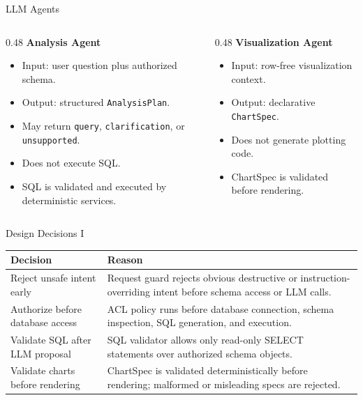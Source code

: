 \documentclass[aspectratio=169]{beamer}
\newcommand{\code}[1]{\texttt{\small #1}}
\begin{document}
\begin{frame}{LLM Agents}
  \small
  \begin{columns}[T]
    \begin{column}{0.48\textwidth}
      \textbf{Analysis Agent}
      \begin{itemize}
        \item Input: user question plus authorized schema.
        \item Output: structured \code{AnalysisPlan}.
        \item May return \code{query}, \code{clarification}, or \code{unsupported}.
        \item Does not execute SQL.
        \item SQL is validated and executed by deterministic services.
      \end{itemize}
    \end{column}

    \begin{column}{0.48\textwidth}
      \textbf{Visualization Agent}
      \begin{itemize}
        \item Input: row-free visualization context.
        \item Output: declarative \code{ChartSpec}.
        \item Does not generate plotting code.
        \item ChartSpec is validated before rendering.
      \end{itemize}
    \end{column}
  \end{columns}
\end{frame}

\begin{frame}{Design Decisions I}
  \small
  \begin{tabular}{p{} p{}}
    \toprule
    \textbf{Decision} & \textbf{Reason} \\
    \midrule
    Reject unsafe intent early &
    Request guard rejects obvious destructive or instruction-overriding intent
    before schema access or LLM calls. \\
    \addlinespace
    Authorize before database access &
    ACL policy runs before database connection, schema inspection, SQL
    generation, and execution. \\
    \addlinespace
    Validate SQL after LLM proposal &
    SQL validator allows only read-only SELECT statements over authorized
    schema objects. \\
    \addlinespace
    Validate charts before rendering &
    ChartSpec is validated deterministically before rendering; malformed or
    misleading specs are rejected. \\
    \bottomrule
  \end{tabular}
\end{frame}
\end{document}
